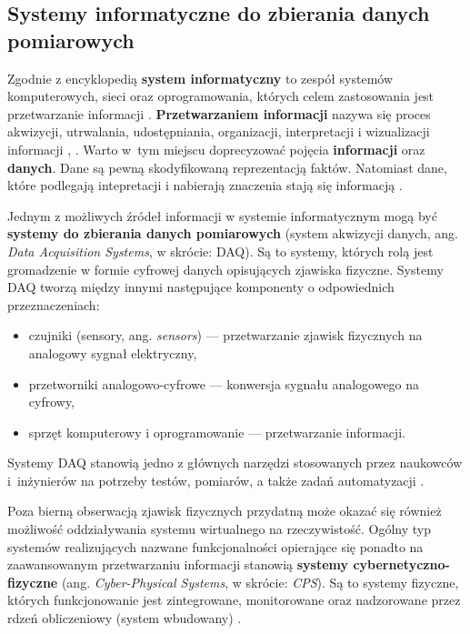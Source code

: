 \documentclass[a4paper, 12pt, twoside]{article}
\begin{document}
\subsection{Systemy informatyczne do zbierania danych pomiarowych} \label{system-do-zbierania-danych}

Zgodnie z encyklopedią \textbf{system informatyczny} to zespół systemów komputerowych,
sieci oraz oprogramowania, których celem zastosowania jest
przetwarzanie informacji \cite{system-informatyczny}.
\textbf{Przetwarzaniem informacji} nazywa się proces akwizycji, utrwalania, udostępniania,
organizacji, interpretacji i wizualizacji informacji \cite{information-science},
\cite{information-processing}. Warto w~tym miejscu doprecyzować pojęcia
\textbf{informacji} oraz \textbf{danych}. Dane są pewną skodyfikowaną reprezentacją
faktów. Natomiast dane, które podlegają intepretacji i nabierają znaczenia
stają się informacją \cite{dane-informacja-wiedza}.

Jednym z możliwych źródeł informacji w systemie informatycznym mogą być
\textbf{systemy do zbierania danych pomiarowych} (system akwizycji danych, ang. \emph{Data Acquisition Systems}, w skrócie: DAQ).
Są to systemy, których rolą jest gromadzenie w formie cyfrowej danych opisujących
zjawiska fizyczne. Systemy DAQ tworzą między innymi następujące komponenty
o odpowiednich przeznaczeniach:
\begin{itemize}
      \itemsep0em
      \item czujniki (sensory, ang. \emph{sensors}) --- przetwarzanie zjawisk fizycznych na analogowy sygnał elektryczny,
      \item przetworniki analogowo-cyfrowe --- konwersja sygnału analogowego na cyfrowy,
      \item sprzęt komputerowy i oprogramowanie --- przetwarzanie informacji.
\end{itemize}
Systemy DAQ stanowią jedno z głównych narzędzi stosowanych przez naukowców i~inżynierów
na potrzeby testów, pomiarów, a także zadań automatyzacji \cite{data-aq-systems}.

Poza bierną obserwacją zjawisk fizycznych przydatną może okazać się również
możliwość oddziaływania systemu wirtualnego na rzeczywistość. Ogólny typ systemów
realizujących nazwane funkcjonalności opierające się ponadto na zaawansowanym przetwarzaniu informacji
stanowią \textbf{systemy cybernetyczno-fizyczne}
(ang. \emph{Cyber-Physical Systems}, w skrócie: \emph{CPS}).
Są to systemy fizyczne, których funkcjonowanie jest zintegrowane, monitorowane oraz
nadzorowane przez rdzeń obliczeniowy (system wbudowany) \cite{iiot-cyber-manufacturing-systems}.
\end{document}
